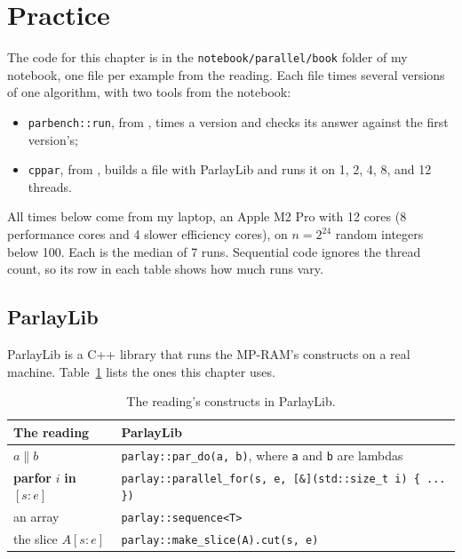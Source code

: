 \section{Practice}

The code for this chapter is in the \texttt{notebook/parallel/book} folder of my notebook, one file per example from the reading. Each file times several versions of one algorithm, with two tools from the notebook:
\begin{itemize}
  \item \texttt{parbench::run}, from , times a version and checks its answer against the first version's;
  \item \texttt{cppar}, from , builds a file with ParlayLib and runs it on 1, 2, 4, 8, and 12 threads.
\end{itemize}

All times below come from my laptop, an Apple M2 Pro with 12 cores (8 performance cores and 4 slower efficiency cores), on $n = 2^{24}$ random integers below 100. Each is the median of 7 runs. Sequential code ignores the thread count, so its row in each table shows how much runs vary.

\subsection{ParlayLib}

ParlayLib is a C++ library that runs the MP-RAM's constructs on a real machine. Table~\ref{tab:parlay} lists the ones this chapter uses.

\begin{table}[ht]
  \centering
  \small
  \caption{The reading's constructs in ParlayLib.}
  \label{tab:parlay}
  \begin{tabular}{@{}ll@{}}
    \toprule
    The reading & ParlayLib \\
    \midrule
    $a \parallel b$ & \texttt{parlay::par\_do(a, b)}, where \texttt{a} and \texttt{b} are lambdas \\
    \textbf{parfor} $i$ \textbf{in} $[s : e]$ & \texttt{parlay::parallel\_for(s, e, [\&](std::size\_t i) \{ ... \})} \\
    an array & \texttt{parlay::sequence<T>} \\
    the slice $A[s : e]$ & \texttt{parlay::make\_slice(A).cut(s, e)} \\
    \bottomrule
  \end{tabular}
\end{table}

